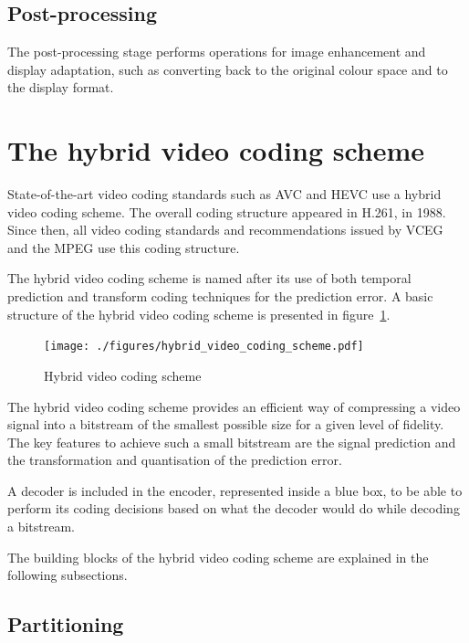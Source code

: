 \documentclass[11pt,a4paper,openright,twoside]{book}
\def\usepdfs{1} %
\numberwithin{equation}{section} %
\numberwithin{figure}{section} %
\numberwithin{table}{section} %
\begin{document}
\subsection{Post-processing}
\label{sub:post_processing}

The post-processing stage performs operations for image enhancement and
display adaptation, such as converting back to the original colour
space and to the display format.

\section{The hybrid video coding scheme}
\label{sec:the_hybrid_video_coding_scheme}

State-of-the-art video coding standards such as \acs{AVC} and \acs{HEVC} use a
hybrid video coding scheme.
The overall coding structure appeared in H.261, in 1988.
Since then, all video coding standards and recommendations issued by
\acs{VCEG} and the \acs{MPEG} use this coding structure.

The hybrid video coding scheme is named after its use of both temporal
prediction and transform coding techniques for the prediction error.
A basic structure of the hybrid video coding scheme is presented in
figure~\ref{fig:hybrid_video_coding_scheme}.

\begin{figure}[tb]
	\centering
	\ifthenelse{\usepdfs = 0}
	{}
	{\texttt{[image: ./figures/hybrid\_video\_coding\_scheme.pdf]}}
	\caption{Hybrid video coding scheme}
	\label{fig:hybrid_video_coding_scheme}
\end{figure}

The hybrid video coding scheme provides an efficient way of compressing
a video signal into a bitstream of the smallest possible size for a given
level of fidelity.
The key features to achieve such a small bitstream are the signal
prediction and the transformation and quantisation of the prediction error.

A decoder is included in the encoder, represented inside a blue box, to be
able to perform its coding decisions based on what the decoder would do
while decoding a bitstream.

The building blocks of the hybrid video coding scheme are explained in
the following subsections.

\subsection{Partitioning}
\label{sub:partitioning}
\end{document}
